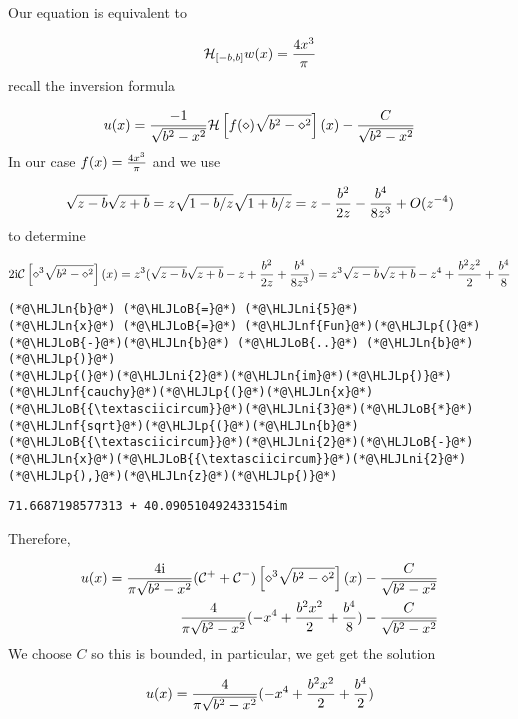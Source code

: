 \documentclass[12pt,landscape]{article}
\newcommand{\HLJLn}[1]{#1}
\newcommand{\HLJLnf}[1]{\textcolor[RGB]{66,102,213}{#1}}
\newcommand{\HLJLni}[1]{\textcolor[RGB]{59,151,46}{#1}}
\newcommand{\HLJLoB}[1]{\textcolor[RGB]{102,102,102}{\textbf{#1}}}
\newcommand{\HLJLp}[1]{#1}
\def\I{ {\rm i} }
\def\CC{ {\cal C} }
\def\HH{ {\cal H} }
\begin{document}
{\begin{itemize}
\end{itemize}
Our equation is equivalent to

\[
\HH_{[-b,b]} w(x) = {4 x^3 \over \pi}
\]
recall the inversion formula

\[
    u(x) =  {-1 \over \sqrt{b^2 - x^2}}\HH \left[{ f(\diamond)  \sqrt{b^2-\diamond^2} }\right](x)  - {C \over \sqrt{b^2-x^2}}
\]
In our case $f(x) = {4 x^3 \over \pi}$ and we use

\[
\sqrt{z-b}\sqrt{z+b} = z\sqrt{1-b/z}\sqrt{1+b/z} = z - {b^2 \over 2 z} -{b^4 \over 8z^3} + O(z^{-4})
\]
to determine

\[
2 \I \CC \left[{ \diamond^3  \sqrt{b^2-\diamond^2} }\right](x) =
z^3(\sqrt{z-b}\sqrt{z+b} -z +  {b^2 \over 2 z} + {b^4 \over 8z^3}) = z^3\sqrt{z-b}\sqrt{z+b} -z^4 +  {b^2z^2 \over 2} + {b^4 \over 8}
\]

\begin{lstlisting}
(*@\HLJLn{b}@*) (*@\HLJLoB{=}@*) (*@\HLJLni{5}@*)
(*@\HLJLn{x}@*) (*@\HLJLoB{=}@*) (*@\HLJLnf{Fun}@*)(*@\HLJLp{(}@*)(*@\HLJLoB{-}@*)(*@\HLJLn{b}@*) (*@\HLJLoB{..}@*) (*@\HLJLn{b}@*)(*@\HLJLp{)}@*)
(*@\HLJLp{(}@*)(*@\HLJLni{2}@*)(*@\HLJLn{im}@*)(*@\HLJLp{)}@*)(*@\HLJLnf{cauchy}@*)(*@\HLJLp{(}@*)(*@\HLJLn{x}@*)(*@\HLJLoB{{\textasciicircum}}@*)(*@\HLJLni{3}@*)(*@\HLJLoB{*}@*)(*@\HLJLnf{sqrt}@*)(*@\HLJLp{(}@*)(*@\HLJLn{b}@*)(*@\HLJLoB{{\textasciicircum}}@*)(*@\HLJLni{2}@*)(*@\HLJLoB{-}@*)(*@\HLJLn{x}@*)(*@\HLJLoB{{\textasciicircum}}@*)(*@\HLJLni{2}@*)(*@\HLJLp{),}@*)(*@\HLJLn{z}@*)(*@\HLJLp{)}@*)
\end{lstlisting}

\begin{lstlisting}
71.6687198577313 + 40.090510492433154im
\end{lstlisting}


Therefore,


\begin{align*}
u(x) = {4\I \over \pi \sqrt{b^2 - x^2}}(\CC^+ + \CC^-) \left[{ \diamond^3  \sqrt{b^2-\diamond^2} }\right](x)  - {C \over \sqrt{b^2-x^2}} \\
{4 \over \pi \sqrt{b^2 - x^2}}(-x^4+{b^2 x^2 \over 2} + {b^4 \over 8})- {C \over \sqrt{b^2-x^2}}
\end{align*}
We choose $C$ so this is bounded, in particular, we get get the solution

\[
u(x) = {4 \over \pi \sqrt{b^2 - x^2}}(-x^4+{b^2 x^2 \over 2} + {b^4 \over 2})
\]

}
\end{document}
